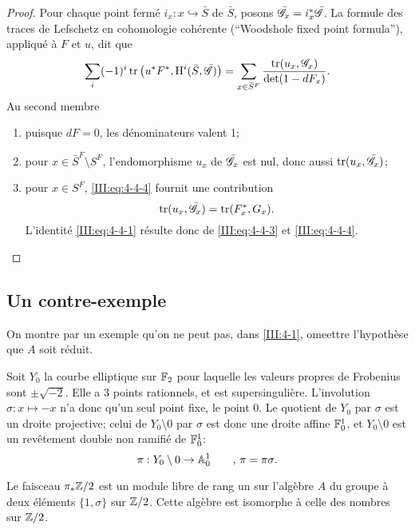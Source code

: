 \begin{proof}
Pour chaque point fermé $i_x:x\hookrightarrow \bar  S$ de $\bar S$, posons 
$\bar{\mathscr{G}}_x = i_x^*\bar{\mathscr{G}}$. La formule des traces de Lefschetz en cohomologie 
cohérente (``Woodshole fixed point formula''), appliqué à $F$ et $u$, dit 
que 
\begin{equation}\label{III:eq:4-4-4}
  \sum_i (-1)^i \operatorname{tr}\left(u^* F^*, \operatorname{H}^i(\bar S,\bar{\mathscr{G}})\right) = \sum_{x\in \bar S^F} \frac{\operatorname{tr}(u_x,\mathscr{G}_x)}{\det(1-d F_x)} \text{.}
\end{equation}
Au second membre
\begin{enumerate}[\indent a)]
  \item puisque $d F=0$, les dénominateurs valent 1;
  \item pour $x\in \bar S^F\setminus S^F$, l'endomorphisme $u_x$ de $\bar{\mathscr{G}}_x$ 
    est nul, donc aussi $\operatorname{tr}(u_x,\bar{\mathscr{G}}_x)$;
  \item pour $x\in S^F$, \eqref{III:eq:4-4-4} fournit une contribution 
    \[
      \operatorname{tr}(u_x,\bar{\mathscr{G}}_x) = \operatorname{tr}(F_x^*,G_x) \text{.}
    \]
    L'identité \eqref{III:eq:4-4-1} résulte donc de \eqref{III:eq:4-4-3} 
    et \eqref{III:eq:4-4-4}. 
\end{enumerate}
\end{proof}





\subsection{Un contre-exemple}\label{III:4-5}

On montre par un exemple qu'on ne peut pas, dans \ref{III:4-1}, omeettre 
l'hypothèse que $A$ soit réduit.

Soit $Y_0$ la courbe elliptique sur $\mathbb{F}_2$ pour laquelle les valeurs propres 
de Frobenius sont $\pm \sqrt{-2}$. Elle a $3$ points rationnels, et est 
supersingulière. L'involution $\sigma:x\mapsto -x$ n'a donc qu'un seul point 
fixe, le point $0$. Le quotient de $Y_0$ par $\sigma$ est un droite projective; 
celui de $Y_0\setminus 0$ par $\sigma$ est donc une droite affine $\mathbb{F}_0^1$, et 
$Y_0\setminus 0$ est un revêtement double non ramifié de $\mathbb{F}_0^1$:
\[
  \pi:Y_0\setminus 0 \to \mathbb{A}_0^1 \qquad \text{, $\pi=\pi\sigma$.}
\]

Le faisceau $\pi_*\mathbb{Z}/2$ est un module libre de rang un sur l'algèbre $A$ du 
groupe à deux éléments $\{1,\sigma\}$ sur $\mathbb{Z}/2$. Cette algèbre est 
isomorphe à celle des nombres sur $\mathbb{Z}/2$. 

